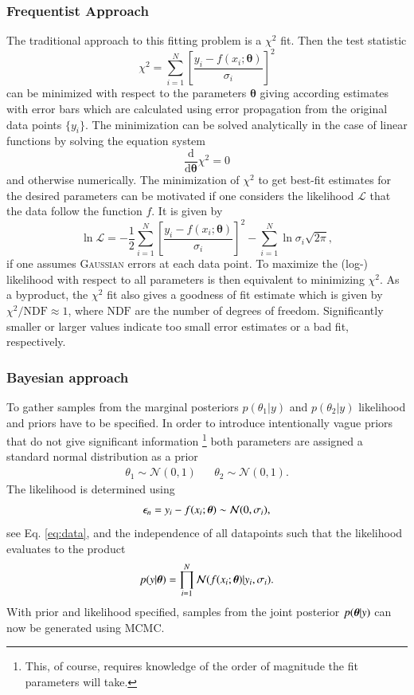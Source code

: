 \subsubsection{Frequentist Approach}
The traditional approach to this fitting problem is a $\chi^2$ fit. Then the test statistic \begin{equation}
	\chi^2=\sum_{i=1}^{N}\left[\frac{y_i-f(x_i;\boldsymbol{\theta})}{\sigma_i}\right]^2
\end{equation}
can be minimized with respect to the parameters $\boldsymbol{\theta}$ giving according estimates with error bars which are calculated using error propagation from the original data points $\{y_i\}$. The minimization can be solved analytically in the case of linear functions by solving the equation system $$\frac{\text{d}}{\text{d}\boldsymbol{\theta}}\chi^2=0$$
and otherwise numerically. The minimization of $\chi^2$ to get best-fit estimates for the desired parameters can be motivated if one considers the likelihood $\mathcal{L}$ that the data follow the function $f$. It is given by \begin{equation}
	\ln\mathcal{L}=-\frac{1}{2}\sum_{i=1}^N\left[\frac{y_i-f(x_i;\boldsymbol{\theta})}{\sigma_i}\right]^2-\sum_{i=1}^N\ln\sigma_i\sqrt{2\pi},
\end{equation}
if one assumes \textsc{Gaussian} errors at each data point. To maximize the (log-) likelihood with respect to all parameters is then equivalent to minimizing $\chi^2$. As a byproduct, the $\chi^2$ fit also gives a goodness of fit estimate which is given by $\chi^2/\text{NDF}\approx 1$, where $\text{NDF}$ are the number of degrees of freedom. Significantly smaller or larger values indicate too small error estimates or a bad fit, respectively. \cite{statistics}
\subsubsection{Bayesian approach}
To gather samples from the marginal posteriors $p(\theta_1|y)$ and $p(\theta_2|y)$ likelihood and priors have to be specified. In order to introduce intentionally vague priors that do not give significant information \footnote{This, of course, requires knowledge of the order of magnitude the fit parameters will take.} both parameters are assigned a standard normal distribution as a prior
\begin{align}
	\theta_1\sim\mathcal{N}(0,1) &&\theta_2\sim\mathcal{N}(0,1).
\end{align}
The likelihood is determined using
\begin{align}
	\epsilon_n = y_i-f(x_i;\boldsymbol{\theta})\sim\mathcal{N}(0,\sigma_i), 
\end{align}
see Eq. \eqref{eq:data}, and the independence of all datapoints such that the likelihood evaluates to the product
\begin{equation}
	p(y|\boldsymbol{\theta})=\prod_{i=1}^N\mathcal{N}(f(x_i;\boldsymbol{\theta})|y_i,\sigma_i).
\end{equation}
With prior and likelihood specified, samples from the joint posterior $p(\boldsymbol{\theta}|y)$ can now be generated using MCMC. \cite{stan}

